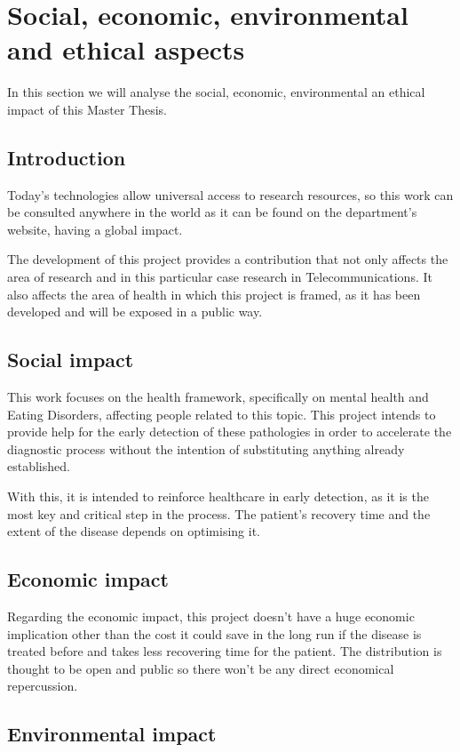\chapter{Social, economic, environmental and ethical aspects}

In this section we will analyse the social, economic, environmental an ethical impact of this Master Thesis.

\section{Introduction}
Today's technologies allow universal access to research resources, so this work can be consulted anywhere in the world as it can be found on the department's website, having a global impact.

The development of this project provides a contribution that not only affects the area of research and in this particular case research in Telecommunications. It also affects the area of health in which this project is framed, as it has been developed and will be exposed in a public way.


\section*{Social impact}
This work focuses on the health framework, specifically on mental health and Eating Disorders, affecting people related to this topic. This project intends to provide help for the early detection of these pathologies in order to accelerate the diagnostic process without the intention of substituting anything already established.

With this, it is intended to reinforce healthcare in early detection, as it is the most key and critical step in the process. The patient's recovery time and the extent of the disease depends on optimising it.

\section*{Economic impact}
Regarding the economic impact, this project doesn't have a huge economic implication other than the cost it could save in the long run if the disease is treated before and takes less recovering time for the patient. The distribution is thought to be open and public so there won't be any direct economical repercussion.

\section*{Environmental impact}

